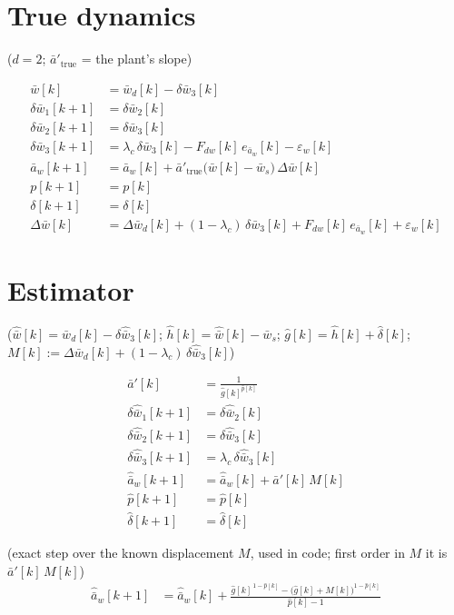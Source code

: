 \documentclass[11pt,a4paper,fontset=none]{ctexart}
\newcommand{\ba}{\bar{a}}
\newcommand{\bw}{\bar{w}}
\newcommand{\dW}{\Delta\bw}
\newcommand{\ap}{\ba'}
\newcommand{\ah}{\hat{\ba}_w}
\newcommand{\wh}{\hat{\bw}}
\newcommand{\hh}{\hat{h}}
\newcommand{\ph}{\hat{p}}
\newcommand{\dl}{\delta}
\newcommand{\dlh}{\hat{\delta}}
\newcommand{\gh}{\hat{g}}
\begin{document}
\section{True dynamics}

($d = 2$; $\ap_{\mathrm{true}}$ = the plant's slope)

\begin{align*}
\bw[k]           &= \bw_d[k] - \delta\bw_3[k] \\
\delta\bw_1[k+1] &= \delta\bw_2[k] \\
\delta\bw_2[k+1] &= \delta\bw_3[k] \\
\delta\bw_3[k+1] &= \lambda_c\,\delta\bw_3[k] - F_{dw}[k]\,e_{\ba_w}[k] - \varepsilon_w[k] \\
\ba_w[k+1]       &= \ba_w[k] + \ap_{\mathrm{true}}\bigl(\bw[k]-\bw_s\bigr)\,\dW[k] \\
p[k+1]           &= p[k] \\
\dl[k+1]         &= \dl[k] \\[4pt]
\dW[k]           &= \Delta\bw_d[k] + (1-\lambda_c)\,\delta\bw_3[k] + F_{dw}[k]\,e_{\ba_w}[k] + \varepsilon_w[k]
\end{align*}

\section{Estimator}

($\wh[k] = \bw_d[k] - \delta\hat{\bw}_3[k]$; $\hh[k] = \wh[k] - \bw_s$; $\gh[k] = \hh[k] + \dlh[k]$; $M[k] := \Delta\bw_d[k] + (1-\lambda_c)\,\delta\hat{\bw}_3[k]$)

\begin{align*}
\ap[k]                 &= \frac{1}{\gh[k]^{\ph[k]}} \\
\delta\hat{\bw}_1[k+1] &= \delta\hat{\bw}_2[k] \\
\delta\hat{\bw}_2[k+1] &= \delta\hat{\bw}_3[k] \\
\delta\hat{\bw}_3[k+1] &= \lambda_c\,\delta\hat{\bw}_3[k] \\
\ah[k+1]               &= \ah[k] + \ap[k]\,M[k] \\
\ph[k+1]               &= \ph[k] \\
\dlh[k+1]              &= \dlh[k]
\end{align*}

(exact step over the known displacement $M$, used in code; first order in $M$ it is $\ap[k]\,M[k]$)
\begin{align*}
\ah[k+1]               &= \ah[k] + \frac{\gh[k]^{\,1-\ph[k]} - \bigl(\gh[k] + M[k]\bigr)^{1-\ph[k]}}{\ph[k] - 1}
\end{align*}
\end{document}
